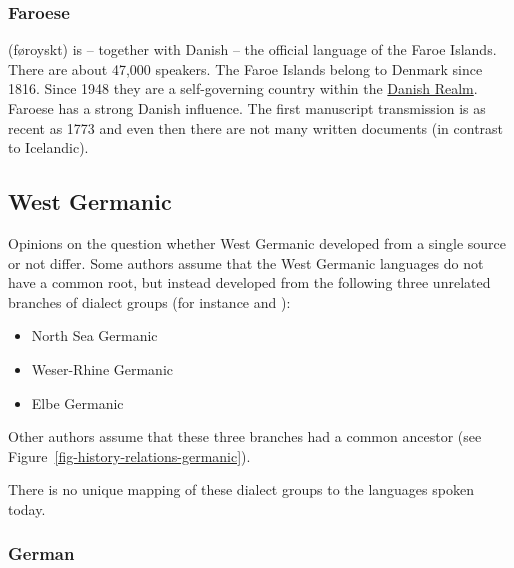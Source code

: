 \subsubsection{Faroese}

 (føroyskt) is -- together with Danish -- the official language of the Faroe Islands. There
are about 47,000 speakers. The Faroe Islands belong to Denmark since 1816. Since 1948 they are a
self-governing country within the \href{https://en.wikipedia.org/wiki/Danish_Realm}{Danish Realm}.
Faroese has a strong Danish influence. The first manuscript transmission is as recent as 1773 and
even then there are not many written documents (in contrast to Icelandic).


\subsection{West Germanic}


Opinions on the question whether West Germanic developed from a single source or not differ. Some authors
assume that the West Germanic languages do not have a common root, but instead developed from the
following three unrelated branches of dialect groups (for instance \citealp[--18]{Robinson1992a-u} and
\citealp[]{HvDA94a}):
\begin{itemize}
\item North Sea Germanic %
\item Weser-Rhine Germanic %
\item Elbe Germanic %
\end{itemize}
Other authors assume that these three branches had a common ancestor (see Figure~\ref{fig-history-relations-germanic}).

There is no unique mapping of these dialect groups to the languages spoken today.





\subsubsection{German}

